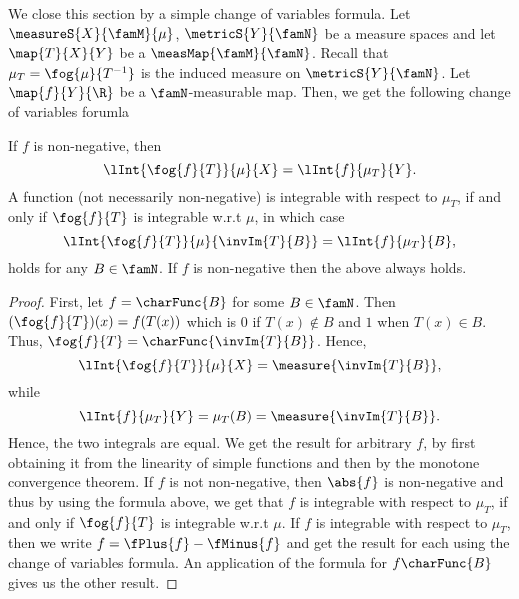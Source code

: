 We close this section by a simple change of variables formula.
Let $\measureS{X}{\famM}{\mu}$, $\metricS{Y}{\famN}$ be a measure spaces and let $\map{T}{X}{Y}$ be a
$\measMap{\famM}{\famN}$. Recall that $\mu_{T} = \fog{\mu}{T^{-1}}$ is the induced measure on
$\metricS{Y}{\famN}$. Let $\map{f}{Y}{\R}$ be a $\famN$-measurable map. Then, we get the following change of
variables forumla
\begin{Theorem}[name=Change of variables]\label{thm:change_var}
    If $f$ is non-negative, then
    \[\lInt{\fog{f}{T}}{\mu}{X} = \lInt{f}{\mu_{T}}{Y}.\]
    A function (not necessarily non-negative) is integrable with respect to $\mu_{T}$, if and only if
    $\fog{f}{T}$ is integrable w.r.t $\mu$, in which case
    \[\lInt{\fog{f}{T}}{\mu}{\invIm{T}{B}} = \lInt{f}{\mu_{T}}{B},\]
    holds for any $B\in\famN$. If $f$ is non-negative then the above always holds.
\end{Theorem}
\begin{proof}
First, let $f = \charFunc{B}$ for some $B \in \famN$. Then $(\fog{f}{T})(x) = f(T(x))$ which is $0$ if
$T(x)\not\in B$ and $1$ when $T(x)\in B$. Thus, $\fog{f}{T} = \charFunc{\invIm{T}{B}}$. Hence,
\[\lInt{\fog{f}{T}}{\mu}{X} = \measure{\invIm{T}{B}},\]
while
\[ \lInt{f}{\mu_{T}}{Y} = \mu_{T}(B) = \measure{\invIm{T}{B}}.\]
Hence, the two integrals are equal. We get the result for arbitrary $f$, by first obtaining it from the
linearity of simple functions and then by the monotone convergence theorem.
If $f$ is not non-negative, then $\abs{f}$ is non-negative and thus by using the formula above, we get that
$f$ is integrable with respect to $\mu_{T}$, if and only if $\fog{f}{T}$ is integrable w.r.t $\mu$. 
If $f$ is integrable with respect to $\mu_{T}$, then we write $f = \fPlus{f} - \fMinus{f}$ and get the result
for each using the change of variables formula. An application of the formula for $f\charFunc{B}$ gives us the
other result.
\end{proof}
